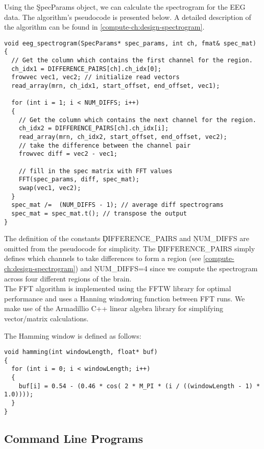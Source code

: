Using the \c{SpecParams} object, we can calculate the spectrogram for the EEG
data. The algorithm's pseudocode is presented below. A detailed description of
the algorithm can be found in \ref{compute-ch:design-spectrogram}.

\begin{lstlisting}
void eeg_spectrogram(SpecParams* spec_params, int ch, fmat& spec_mat)
{
  // Get the column which contains the first channel for the region.
  ch_idx1 = DIFFERENCE_PAIRS[ch].ch_idx[0];
  frowvec vec1, vec2; // initialize read vectors
  read_array(mrn, ch_idx1, start_offset, end_offset, vec1);

  for (int i = 1; i < NUM_DIFFS; i++)
  {
    // Get the column which contains the next channel for the region.
    ch_idx2 = DIFFERENCE_PAIRS[ch].ch_idx[i];
    read_array(mrn, ch_idx2, start_offset, end_offset, vec2);
    // take the difference between the channel pair
    frowvec diff = vec2 - vec1;

    // fill in the spec matrix with FFT values
    FFT(spec_params, diff, spec_mat);
    swap(vec1, vec2);
  }
  spec_mat /=  (NUM_DIFFS - 1); // average diff spectrograms
  spec_mat = spec_mat.t(); // transpose the output
}
\end{lstlisting}

The definition of the constants \c{DIFFERENCE\_PAIRS} and \c{NUM\_DIFFS} are
omitted from the pseudocode for simplicity. The \c{DIFFERENCE\_PAIRS} simply
defines which channels to take differences to form a region (see
\ref{compute-ch:design-spectrogram}) and \c{NUM\_DIFFS=4} since we compute the
spectrogram across four different regions of the brain. \\

The FFT algorithm is implemented using the FFTW library \cite{fftw} for optimal
performance and uses a Hanning windowing function between FFT runs. We make use
of the Armadillio C++ linear algebra library \cite{arma} for simplifying
vector/matrix calculations.

The Hamming window is defined as follows:

\begin{lstlisting}
void hamming(int windowLength, float* buf)
{
  for (int i = 0; i < windowLength; i++)
  {
    buf[i] = 0.54 - (0.46 * cos( 2 * M_PI * (i / ((windowLength - 1) * 1.0))));
  }
}
\end{lstlisting}

\subsection{Command Line Programs}\label{compute-ch:implementation-cmd}

